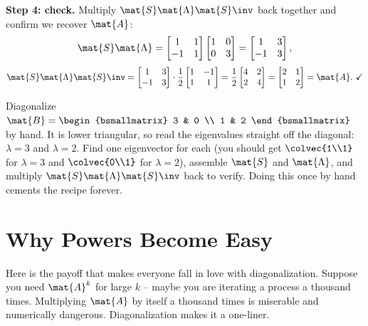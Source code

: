 \textbf{Step 4: check.} Multiply $\mat{S}\mat{\Lambda}\mat{S}\inv$ back together
and confirm we recover $\mat{A}$:
\[
  \mat{S}\mat{\Lambda}
  = \begin{bmatrix} 1 & 1 \\ -1 & 1 \end{bmatrix}\begin{bmatrix} 1 & 0 \\ 0 & 3 \end{bmatrix}
  = \begin{bmatrix} 1 & 3 \\ -1 & 3 \end{bmatrix},
\]
\[
  \mat{S}\mat{\Lambda}\mat{S}\inv
  = \begin{bmatrix} 1 & 3 \\ -1 & 3 \end{bmatrix}\cdot\frac{1}{2}\begin{bmatrix} 1 & -1 \\ 1 & 1 \end{bmatrix}
  = \frac{1}{2}\begin{bmatrix} 4 & 2 \\ 2 & 4 \end{bmatrix}
  = \begin{bmatrix} 2 & 1 \\ 1 & 2 \end{bmatrix} = \mat{A}.\ \checkmark
\]

\begin{labbox}
Diagonalize $\mat{B} = \begin{bsmallmatrix} 3 & 0 \\ 1 & 2 \end{bsmallmatrix}$ by
hand. It is lower triangular, so read the eigenvalues straight off the diagonal:
$\lambda = 3$ and $\lambda = 2$. Find one eigenvector for each (you should get
$\colvec{1\\1}$ for $\lambda=3$ and $\colvec{0\\1}$ for $\lambda=2$), assemble
$\mat{S}$ and $\mat{\Lambda}$, and multiply $\mat{S}\mat{\Lambda}\mat{S}\inv$
back to verify. Doing this once by hand cements the recipe forever.
\end{labbox}

\section{Why Powers Become Easy}
\label{ch24:powers}

Here is the payoff that makes everyone fall in love with diagonalization. Suppose
you need $\mat{A}^k$ for large $k$ -- maybe you are iterating a process a thousand
times. Multiplying $\mat{A}$ by itself a thousand times is miserable and
numerically dangerous. Diagonalization makes it a one-liner.

